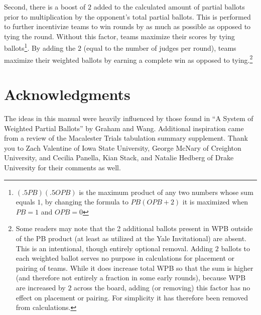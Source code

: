 \documentclass{article}
\begin{document}
Second, there is a boost of $2$ added to the calculated amount of partial ballots prior to multiplication by the opponent's total partial ballots.  This is performed to further incentivize teams to win rounds by as much as possible as opposed to tying the round.  Without this factor, teams maximize their scores by tying ballots\footnote{$\left(.5PB\right)\left(.5OPB\right)$ is the maximum product of any two numbers whose sum equals $1$, by changing the formula to $PB\left(OPB+2\right)$ it is maximized when $PB=1$ and $OPB=0$}.  By adding the $2$ (equal to the number of judges per round), teams maximize their weighted ballots by earning a complete win as opposed to tying.\footnote{Some readers may note that the 2 additional ballots present in WPB outside of the PB product (at least as utilized at the Yale Invitational) are absent.  This is an intentional, though entirely optional removal.  Adding $2$ ballots to each weighted ballot serves no purpose in calculations for placement or pairing of teams.  While it does increase total WPB so that the sum is higher (and therefore not entirely a fraction in some early rounds), because WPB are increased by $2$ across the board, adding (or removing) this factor has no effect on placement or pairing.  For simplicity it has therefore been removed from calculations.}

\section{Acknowledgments}
The ideas in this manual were heavily influenced by those found in ``A System of Weighted Partial Ballots'' by Graham and Wang.  Additional inspiration came from a review of the Macalester Trials tabulation summary supplement.  Thank you to Zach Valentine of Iowa State University, George McNary of Creighton University, and Cecilia Panella, Kian Stack, and Natalie Hedberg of Drake University for their comments as well.
\end{document}
